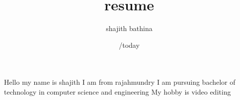 \documentclass{article}
\title{resume}
\author{shajith bathina}
\date{/today}
\begin{document}
\maketitle

Hello my name is shajith 
I am from rajahmundry
I am pursuing bachelor of technology in computer science and engineering
My hobby is video editing
\end{document}
